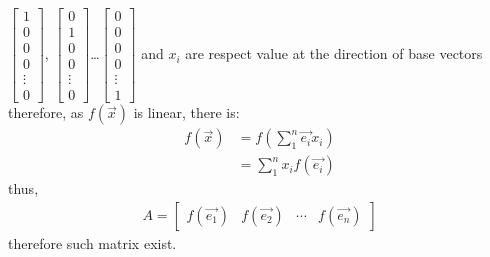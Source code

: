 \documentclass{article}
\begin{document}
\(\begin{bmatrix}
    1\\0\\0\\0\\ \vdots \\ 0
\end{bmatrix} 
\),
\(\begin{bmatrix}
    0\\1\\0\\0\\ \vdots \\ 0
\end{bmatrix} 
\)\dots\(\begin{bmatrix}
    0\\0\\0\\0\\ \vdots \\ 1
\end{bmatrix} 
\)
and \(x_i\) are respect value at the direction of base vectors
therefore, as \(f(\overrightarrow{x})\) is linear, there is:
\begin{align*}
    f(\overrightarrow{x})&=f\left(\sum_1^n \overrightarrow{e_i}x_i\right)\\
    &=\sum_1^n x_i f(\overrightarrow{e_i})
\end{align*}
thus, 
\begin{align*}
    A = 
    \begin{bmatrix}
        f(\overrightarrow{e_1})&f(\overrightarrow{e_2})&\cdots&f(\overrightarrow{e_n})
    \end{bmatrix}
\end{align*}
therefore such matrix exist.
\end{document}
